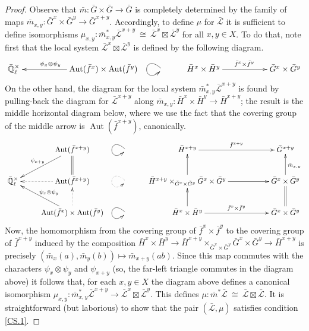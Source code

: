 \documentclass[11pt]{amsart}
\theoremstyle{plain}
\theoremstyle{definition}
\theoremstyle{remark}
\newcommand{\EE}{\mathbb{\bar Q}_\ell}
\DeclareMathOperator{\Aut}{Aut}
\newcommand{\iso}{{\ \cong\ }}
\newcommand{\gcs}[1]{{\mathcal{\bar #1}}}
\begin{document}
\begin{proof}
  Observe that ${\bar m}: {\bar G}\times {\bar G}\to {\bar G}$ is
  completely determined by the family of maps
  ${\bar m}_{x,y} : {\bar G}^x \times {\bar G}^{y} \to {\bar G}^{x+y}$.
  Accordingly, to define $\mu$ for $\gcs{L}$ it is sufficient to define isomorphisms
  $\mu_{x,y} : {\bar m}_{x,y}^*\gcs{L}^{x+y} \iso \gcs{L}^{x}\boxtimes \gcs{L}^{y}$
  for all $x,y\in X$. To do that, note first that the local system
  $\gcs{L}^{x}\boxtimes \gcs{L}^{y}$ is defined by the following diagram.
  \[
  \xymatrix{
    \EE^\times && \ar[ll]_{\hskip-20pt \psi_x\otimes \psi_y} \Aut({\bar f}^x)\times \Aut({\bar f}^y)
    & \ar@(ul,dl) & {\bar H}^x\times {\bar H}^y \ar[rr]^{{\bar f}^x\times {\bar f}^y} && {\bar G}^x\times {\bar G}^y\\
    }
  \]
  On the other hand, the diagram for the local system ${\bar m}_{x,y}^* \gcs{L}^{x+y}$
  is found by pulling-back the diagram for $\gcs{L}^{x+y}$ along
  ${\bar m}_{x,y} : {\bar H}^x\times{\bar H}^y \to {\bar H}^{x+y}$;
  the result is the middle horizontal diagram below, where we use the
  fact that the covering group of the middle arrow is $\Aut({\bar f}^{x+y})$, canonically.
  \[
  \xymatrix{
    & \ar[dl]_{\psi_{x+y}} \Aut({\bar f}^{x+y})
    & \ar@(ul,dl) & {\bar H}^{x+y} \ar[rr]^{{\bar f}^{x+y}} && {\bar G}^{x+y}\\
    \EE^\times & \ar@{.>}[l] \Aut({\bar f}^{x+y})  \ar@{=}[u] &  \ar@{.>}@(ul,dl)
    & \ar[u] {\bar H}^{x+y} \times_{{\bar G}^x\times{\bar G}^y} {\bar G}^x\times{\bar G}^y \ar[rr]
    && \ar[u]_{{\bar m}_{x,y}} {\bar G}^x\times {\bar G}^y\\
    & \ar[lu]_{\psi_x\otimes \psi_y} \ar@{.>}[u] \Aut({\bar f}^x)\times \Aut({\bar f}^y)
    & \ar@(ul,dl) & \ar[u] {\bar H}^x\times {\bar H}^y \ar[rr]^{{\bar f}^x\times {\bar f}^y}
    && \ar@{=}[u] {\bar G}^x\times {\bar G}^y\\
    }
  \]
  Now, the homomorphism from the covering group of
  ${\bar f}^x\times{\bar f}^y$ to the covering group of
  ${\bar f}^{x+y}$ induced by the composition
  $ {\bar H}^x\times {\bar H}^y \to {\bar H}^{x+y} \times_{{\bar G}^x\times{\bar G}^y} {\bar G}^x\times{\bar G}^y \to {\bar H}^{x+y}$
  is precisely $({\bar m}_x(a),{\bar m}_y(b)) \mapsto {\bar m}_{x+y}(ab)$.
  Since this map commutes with the characters $\psi_x\otimes\psi_y$
  and $\psi_{x+y}$ (so, the far-left triangle commutes in the diagram above)
  it follows that, for each $x,y\in X$ the diagram above defines a canonical isomorphism
  $\mu_{x,y} : {\bar m}_{x,y}^* \gcs{L}^{x+y} \to \gcs{L}^x \boxtimes\gcs{L}^y$.
  This defines $\mu: {\bar m}^* \gcs{L} \iso \gcs{L} \boxtimes\gcs{L}$.
  It is straightforward (but laborious) to show that the pair
  $(\gcs{L},\mu)$ satisfies condition \ref{CS.1}.


\end{proof}
\end{document}
